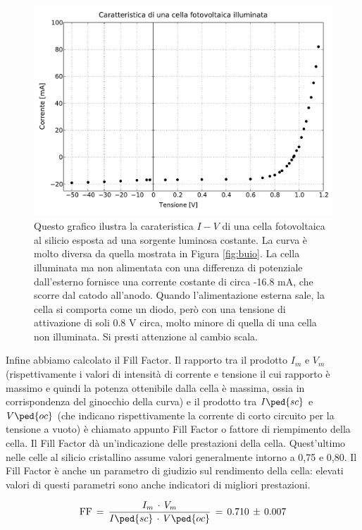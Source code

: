 \begin{figure}
    \includegraphics[scale=0.53]{luce.pdf}
    \caption{Questo grafico ilustra la carateristica $I-V$ di una cella fotovoltaica al silicio esposta ad una sorgente luminosa costante. La curva è molto diversa da quella mostrata
        in Figura \ref{fig:buio}. La cella illuminata ma non alimentata con una differenza di potenziale dall'esterno fornisce una corrente costante di circa -16.8 mA, che scorre
        dal catodo all'anodo. Quando l'alimentazione esterna sale, la cella si comporta come un diodo, però con una tensione di attivazione di soli 0.8 V circa, molto minore di quella
        di una cella non illuminata. Si presti attenzione al cambio scala.}
    \label{fig:luce}
\end{figure}

Infine abbiamo calcolato il Fill Factor. Il rapporto tra il prodotto $I_m$ e $V_m$ (rispettivamente i valori di intensità di corrente e tensione il cui rapporto è massimo e quindi la potenza ottenibile dalla cella è massima, ossia in corrispondenza del ginocchio della curva) e il prodotto tra $I\ped{sc}$ e $V\ped{oc}$ (che indicano rispettivamente la corrente di corto circuito per la tensione a vuoto) è chiamato appunto Fill Factor o fattore di riempimento della cella.
Il Fill Factor dà un’indicazione delle prestazioni della cella.
Quest’ultimo nelle celle al silicio cristallino assume valori generalmente intorno a 0,75 e 0,80. Il Fill Factor è anche un parametro di giudizio sul rendimento della cella: elevati valori di questi parametri sono anche indicatori di migliori prestazioni.

\begin{equation}
	\text{FF} \,=\, \frac{I_m\,\cdot\,V_m}{I\ped{sc}\,\cdot\,V\ped{oc}} \,=\, 0.710\,\pm\,0.007
\end{equation}

